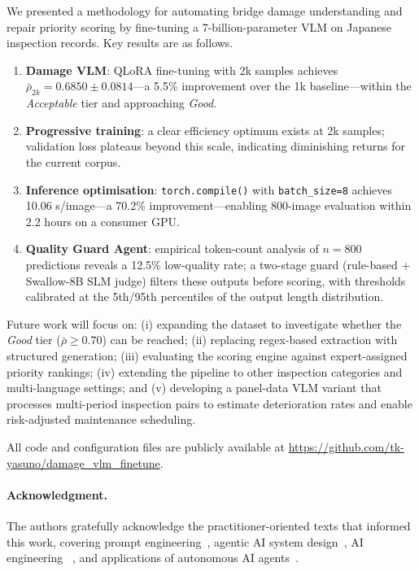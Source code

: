 \documentclass[twocolumn]{article}
\begin{document}
We presented a methodology for automating bridge damage understanding and
repair priority scoring by fine-tuning a 7-billion-parameter VLM on
Japanese inspection records.
Key results are as follows.
\begin{enumerate}[leftmargin=*,itemsep=1pt]
  \item \textbf{Damage VLM}: QLoRA fine-tuning with 2k samples achieves
        $\bar{\rho}_{2k}=0.6850\pm0.0814$---a 5.5\% improvement over the
        1k baseline---within the \textit{Acceptable} tier and approaching
        \textit{Good}.
  \item \textbf{Progressive training}: a clear efficiency optimum exists
        at 2k samples; validation loss plateaus beyond this scale, indicating
        diminishing returns for the current corpus.
  \item \textbf{Inference optimisation}: \texttt{torch.compile()} with
        \texttt{batch\_size=8} achieves 10.06 s/image---a 70.2\%
        improvement---enabling 800-image evaluation within 2.2 hours on a
        consumer GPU.
  \item \textbf{Quality Guard Agent}: empirical token-count analysis of
        $n=800$ predictions reveals a 12.5\% low-quality rate; a two-stage
        guard (rule-based + Swallow-8B SLM judge) filters these outputs
        before scoring, with thresholds calibrated at the 5th/95th
        percentiles of the output length distribution.
\end{enumerate}

Future work will focus on: (i) expanding the dataset to investigate
whether the \textit{Good} tier ($\bar{\rho}\geq 0.70$) can be reached;
(ii) replacing regex-based extraction with structured generation;
(iii) evaluating the scoring engine against expert-assigned priority rankings;
(iv) extending the pipeline to other inspection categories and
multi-language settings; and (v) developing a panel-data VLM variant that
processes multi-period inspection pairs to estimate deterioration rates and
enable risk-adjusted maintenance scheduling.

All code and configuration files are publicly available at
\url{https://github.com/tk-yasuno/damage_vlm_finetune}.

\paragraph{Acknowledgment.}
The authors gratefully acknowledge the practitioner-oriented texts that
informed this work, covering
prompt engineering~\cite{berryman2024prompt},
agentic AI system design~\cite{biswas2025agentic},
AI engineering ~\cite{huyen2024aiengineering},
and applications of autonomous AI agents~\cite{albada2025aiagents}.
\end{document}
